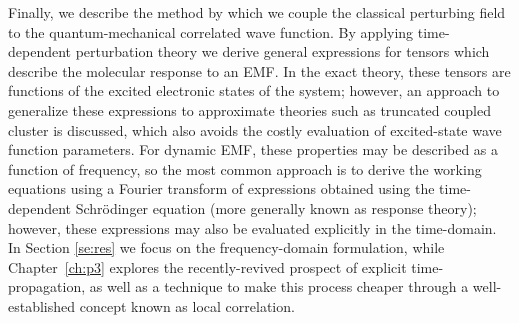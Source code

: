 Finally, we describe the method by which we couple the classical perturbing field to the 
quantum-mechanical correlated wave function. 
By applying time-dependent perturbation theory\cite{Langhoff} 
we derive general expressions for tensors which describe 
the molecular response to an EMF. In the exact theory, these tensors are functions of the 
excited electronic states of the system; however, an approach to generalize 
these expressions to approximate theories such as truncated coupled cluster is discussed,
\cite{Koch1990,Pedersen1997,Christiansen1998,Norman2011}
which also avoids the costly evaluation of excited-state wave function parameters. 
For dynamic EMF, these properties may be 
described as a function of frequency, so the most common approach is to derive the working equations
using a Fourier transform of expressions obtained using the time-dependent Schr\"odinger equation 
(more generally known as response theory); however, these expressions may also be evaluated explicitly
in the time-domain.
\cite{Goings2018,Li2020}
In Section \ref{se:res} we focus on the frequency-domain formulation, while
Chapter~\ref{ch:p3} explores the recently-revived prospect of explicit time-propagation, as well as a 
technique to make this process cheaper through a well-established concept known as 
local correlation.\cite{Werner2006} 
